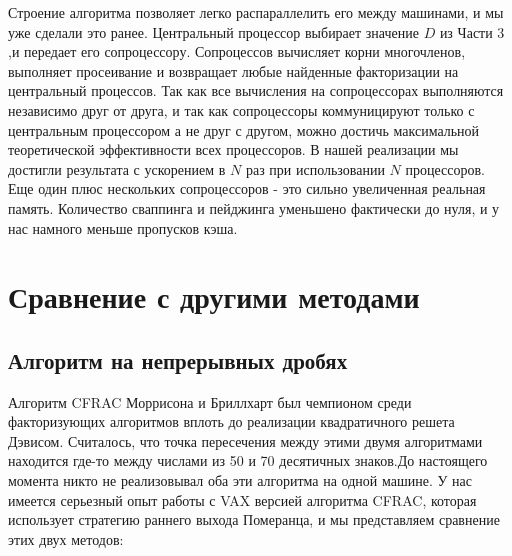 \documentclass[a4paper,12pt]{report}
\begin{document}
Строение алгоритма позволяет легко распараллелить его между машинами, и мы уже сделали это ранее. Центральный процессор выбирает значение $D$ из Части 3 ,и передает его сопроцессору. Сопроцессов вычисляет корни многочленов, выполняет просеивание и возвращает любые найденные факторизации на центральный процессов. Так как все вычисления на сопроцессорах выполняются независимо друг от друга, и так как сопроцессоры коммуницируют только с центральным процессором а не друг с другом, можно достичь максимальной теоретической эффективности всех процессоров. В нашей реализации мы достигли результата с ускорением в $N$ раз при использовании $N$ процессоров. Еще один плюс нескольких сопроцессоров - это сильно увеличенная реальная память. Количество сваппинга и пейджинга уменьшено фактически до нуля, и у нас намного меньше пропусков кэша.

\section{Сравнение с другими методами}

\subsection{Алгоритм на непрерывных дробях}
Алгоритм CFRAC Моррисона и Бриллхарт был чемпионом среди факторизующих алгоритмов вплоть до реализации квадратичного решета Дэвисом. Считалось, что точка пересечения между этими двумя алгоритмами находится где-то между числами из 50 и 70 десятичных знаков.До настоящего момента никто не реализовывал оба эти алгоритма на одной машине. У нас имеется серьезный опыт работы с VAX версией алгоритма CFRAC, которая использует стратегию раннего выхода Померанца, и мы представляем сравнение этих двух методов:
\end{document}
